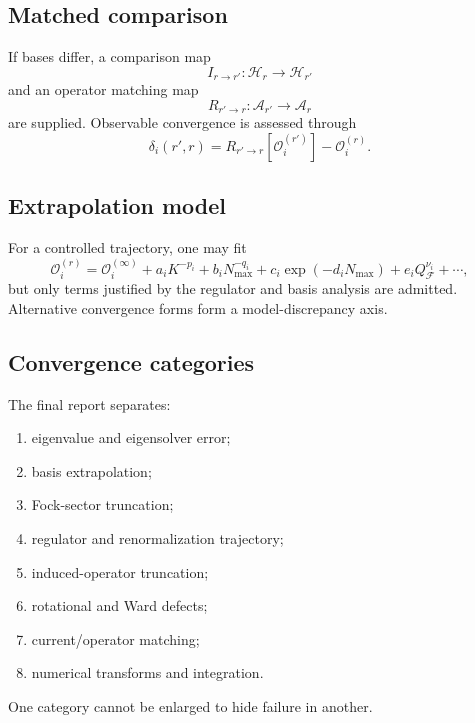\documentclass[11pt]{article}
\newcommand{\Hil}{\mathcal H}
\newcommand{\cO}{\mathcal O}
\newcommand{\cF}{\mathcal F}
\newcommand{\cA}{\mathcal A}
\begin{document}
\subsection{Matched comparison}

If bases differ, a comparison map
\begin{equation}
 I_{r\to r'}:\Hil_r\to\Hil_{r'}
 \label{eq:comparison-map}
\end{equation}
and an operator matching map
\begin{equation}
 R_{r'\to r}:\cA_{r'}\to\cA_r
 \label{eq:operator-comparison}
\end{equation}
are supplied.  Observable convergence is assessed through
\begin{equation}
 \delta_i(r',r)
 =R_{r'\to r}\left[\cO_i^{(r')}\right]
 -\cO_i^{(r)}.
 \label{eq:convergence-residual}
\end{equation}

\subsection{Extrapolation model}

For a controlled trajectory, one may fit
\begin{equation}
 \cO_i^{(r)}
 =\cO_i^{(\infty)}
 +a_iK^{-p_i}
 +b_iN_{\max}^{-q_i}
 +c_i\exp(-d_iN_{\max})
 +e_iQ_{\cF}^{\nu_i}
 +\cdots,
 \label{eq:convergence-fit}
\end{equation}
but only terms justified by the regulator and basis analysis are admitted.
Alternative convergence forms form a model-discrepancy axis.

\subsection{Convergence categories}

The final report separates:
\begin{enumerate}
 \item eigenvalue and eigensolver error;
 \item basis extrapolation;
 \item Fock-sector truncation;
 \item regulator and renormalization trajectory;
 \item induced-operator truncation;
 \item rotational and Ward defects;
 \item current/operator matching;
 \item numerical transforms and integration.
\end{enumerate}
One category cannot be enlarged to hide failure in another.
\end{document}
